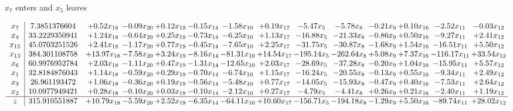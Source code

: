 \documentclass[8pt]{article}
\begin{document}
 $ x_{7} $ enters and $ x_{5} $ leaves 

 \[\begin{array}{c| c c@{\hskip 2pt} c@{\hskip 2pt} c@{\hskip 2pt} c@{\hskip 2pt} c@{\hskip 2pt} c@{\hskip 2pt} c@{\hskip 2pt} c@{\hskip 2pt} c@{\hskip 2pt} c@{\hskip 2pt} c@{\hskip 2pt} c@{\hskip 2pt} }
 x_{7}   &  7.3851376604 & +  0.52 x_{18} & -0.09 x_{20} & +  0.12 x_{19} & -0.15 x_{14} & -1.58 x_{10} & +  0.19 x_{17} & -5.47 x_{5} & -5.78 x_{8} & -0.21 x_{9} & +  0.10 x_{16} & -2.52 x_{11} & -0.03 x_{12}\\
 x_{4}   &  33.2229350941 & +  1.24 x_{18} & -0.64 x_{20} & +  0.25 x_{19} & -0.73 x_{14} & -6.25 x_{10} & +  1.13 x_{17} & -16.88 x_{5} & -21.33 x_{8} & -0.86 x_{9} & +  0.50 x_{16} & -9.27 x_{11} & +  2.41 x_{12}\\
 x_{15}   &  45.0703251526 & +  2.41 x_{18} & -1.17 x_{20} & +  0.77 x_{19} & -0.45 x_{14} & -7.65 x_{10} & +  2.25 x_{17} & -31.75 x_{5} & -30.87 x_{8} & -1.68 x_{9} & +  1.54 x_{16} & -16.51 x_{11} & +  5.50 x_{12}\\
 x_{13}   &  384.301108758 & + 13.97 x_{18} & -7.58 x_{20} & +  3.24 x_{19} & -8.16 x_{14} & -81.31 x_{10} & + 14.54 x_{17} & -195.14 x_{5} & -262.64 x_{8} & +  5.08 x_{9} & +  7.37 x_{16} & -116.17 x_{11} & + 33.54 x_{12}\\
 x_{6}   &  60.9976952784 & +  2.03 x_{18} & -1.11 x_{20} & +  0.47 x_{19} & -1.31 x_{14} & -12.65 x_{10} & +  2.03 x_{17} & -28.69 x_{5} & -37.28 x_{8} & -0.20 x_{9} & +  1.04 x_{16} & -15.95 x_{11} & +  5.57 x_{12}\\
 x_{1}   &  32.8184876043 & +  1.14 x_{18} & -0.59 x_{20} & +  0.29 x_{19} & -0.70 x_{14} & -6.74 x_{10} & +  1.15 x_{17} & -16.24 x_{5} & -20.55 x_{8} & -0.13 x_{9} & +  0.55 x_{16} & -9.34 x_{11} & +  2.49 x_{12}\\
 x_{3}   &  26.961193472 & +  1.06 x_{18} & -0.36 x_{20} & +  0.19 x_{19} & -0.56 x_{14} & -5.48 x_{10} & +  0.77 x_{17} & -14.05 x_{5} & -15.93 x_{8} & -0.47 x_{9} & +  0.40 x_{16} & -7.53 x_{11} & +  2.64 x_{12}\\
 x_{2}   &  10.0977949421 & +  0.28 x_{18} & -0.10 x_{20} & +  0.03 x_{19} & -0.10 x_{14} & -2.12 x_{10} & +  0.27 x_{17} & -4.79 x_{5} & -4.41 x_{8} & +  0.26 x_{9} & +  0.21 x_{16} & -2.40 x_{11} & +  1.19 x_{12}\\
\hline
z    &  315.910551887 & + 10.79 x_{18} & -5.59 x_{20} & +  2.52 x_{19} & -6.35 x_{14} & -64.11 x_{10} & + 10.60 x_{17} & -156.71 x_{5} & -194.18 x_{8} & -1.29 x_{9} & +  5.50 x_{16} & -89.74 x_{11} & + 28.02 x_{12}\\
\end{array}\]
\end{document}
